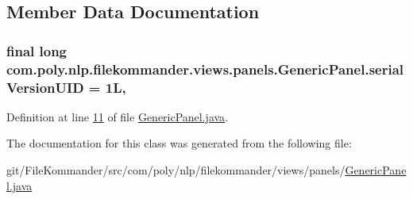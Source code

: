 \subsection{Member Data Documentation}
\hypertarget{classcom_1_1poly_1_1nlp_1_1filekommander_1_1views_1_1panels_1_1_generic_panel_ac3f7f05bbdfeb29c6d8dd1eebfbda726}{
\subsubsection[{serial\-Version\-U\-I\-D}]{\setlength{\rightskip}{0pt plus 5cm}final long com.\-poly.\-nlp.\-filekommander.\-views.\-panels.\-Generic\-Panel.\-serial\-Version\-U\-I\-D = 1\-L\hspace{0.3cm}{\ttfamily [static]}, {\ttfamily [private]}}}\label{classcom_1_1poly_1_1nlp_1_1filekommander_1_1views_1_1panels_1_1_generic_panel_ac3f7f05bbdfeb29c6d8dd1eebfbda726}


Definition at line \hyperlink{L11}{11} of file \hyperlink{}{Generic\-Panel.\-java}.



The documentation for this class was generated from the following file\-:\begin{DoxyCompactItemize}
\item 
git/\-File\-Kommander/src/com/poly/nlp/filekommander/views/panels/\hyperlink{_generic_panel_8java}{Generic\-Panel.\-java}\end{DoxyCompactItemize}
